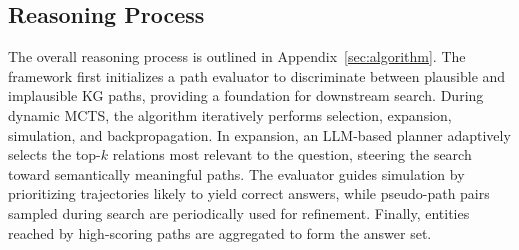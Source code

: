 
\subsection{Reasoning Process}

The overall reasoning process is outlined in Appendix~\ref{sec:algorithm}. The framework first initializes a path evaluator to discriminate between plausible and implausible KG paths, providing a foundation for downstream search. During dynamic MCTS, the algorithm iteratively performs selection, expansion, simulation, and backpropagation. In expansion, an LLM-based planner adaptively selects the top-$k$ relations most relevant to the question, steering the search toward semantically meaningful paths. The evaluator guides simulation by prioritizing trajectories likely to yield correct answers, while pseudo-path pairs sampled during search are periodically used for refinement. Finally, entities reached by high-scoring paths are aggregated to form the answer set.




